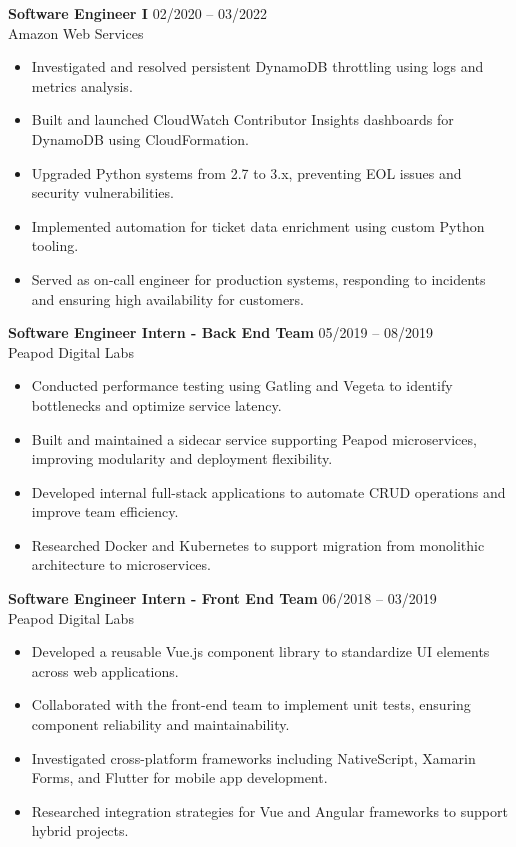 \documentclass[11pt]{article}
\begin{document}
    \noindent\textbf{Software Engineer I} \hfill 02/2020 -- 03/2022 \\
    Amazon Web Services
    \begin{itemize}
        \item Investigated and resolved persistent DynamoDB throttling using logs and metrics analysis.
        \item Built and launched CloudWatch Contributor Insights dashboards for DynamoDB using CloudFormation.
        \item Upgraded Python systems from 2.7 to 3.x, preventing EOL issues and security vulnerabilities.
        \item Implemented automation for ticket data enrichment using custom Python tooling.
        \item Served as on-call engineer for production systems, responding to incidents and ensuring high availability for customers.
    \end{itemize}

    \noindent\textbf{Software Engineer Intern - Back End Team} \hfill 05/2019 -- 08/2019 \\
    Peapod Digital Labs
    \begin{itemize}
        \item Conducted performance testing using Gatling and Vegeta to identify bottlenecks and optimize service latency.
        \item Built and maintained a sidecar service supporting Peapod microservices, improving modularity and deployment flexibility.
        \item Developed internal full-stack applications to automate CRUD operations and improve team efficiency.
        \item Researched Docker and Kubernetes to support migration from monolithic architecture to microservices.
    \end{itemize}

    \vspace{2mm}

    \noindent\textbf{Software Engineer Intern - Front End Team} \hfill 06/2018 -- 03/2019 \\
    Peapod Digital Labs
    \begin{itemize}
        \item Developed a reusable Vue.js component library to standardize UI elements across web applications.
        \item Collaborated with the front-end team to implement unit tests, ensuring component reliability and maintainability.
        \item Investigated cross-platform frameworks including NativeScript, Xamarin Forms, and Flutter for mobile app development.
        \item Researched integration strategies for Vue and Angular frameworks to support hybrid projects.
    \end{itemize}
\end{document}
